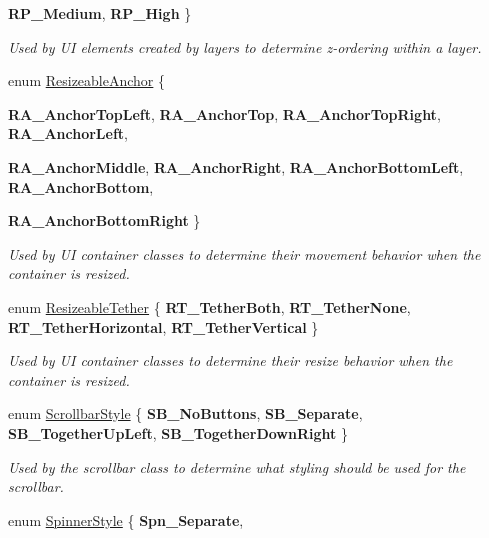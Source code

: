 \begin{DoxyCompactItemize}
{\bfseries RP\_\-Medium}, 
{\bfseries RP\_\-High}
 \}
\begin{DoxyCompactList}\small\item\em Used by UI elements created by layers to determine z-\/ordering within a layer. \item\end{DoxyCompactList}\item 
enum \hyperlink{namespaceMezzanine_1_1UI_a1c571649db3aa98f4e16285b5b754928}{ResizeableAnchor} \{ \par
{\bfseries RA\_\-AnchorTopLeft}, 
{\bfseries RA\_\-AnchorTop}, 
{\bfseries RA\_\-AnchorTopRight}, 
{\bfseries RA\_\-AnchorLeft}, 
\par
{\bfseries RA\_\-AnchorMiddle}, 
{\bfseries RA\_\-AnchorRight}, 
{\bfseries RA\_\-AnchorBottomLeft}, 
{\bfseries RA\_\-AnchorBottom}, 
\par
{\bfseries RA\_\-AnchorBottomRight}
 \}
\begin{DoxyCompactList}\small\item\em Used by UI container classes to determine their movement behavior when the container is resized. \item\end{DoxyCompactList}\item 
enum \hyperlink{namespaceMezzanine_1_1UI_a0334e290e4c9f6a5468fbe11164a17b9}{ResizeableTether} \{ {\bfseries RT\_\-TetherBoth}, 
{\bfseries RT\_\-TetherNone}, 
{\bfseries RT\_\-TetherHorizontal}, 
{\bfseries RT\_\-TetherVertical}
 \}
\begin{DoxyCompactList}\small\item\em Used by UI container classes to determine their resize behavior when the container is resized. \item\end{DoxyCompactList}\item 
enum \hyperlink{namespaceMezzanine_1_1UI_a5998a9bf372a7e92605c0c461736e763}{ScrollbarStyle} \{ {\bfseries SB\_\-NoButtons}, 
{\bfseries SB\_\-Separate}, 
{\bfseries SB\_\-TogetherUpLeft}, 
{\bfseries SB\_\-TogetherDownRight}
 \}
\begin{DoxyCompactList}\small\item\em Used by the scrollbar class to determine what styling should be used for the scrollbar. \item\end{DoxyCompactList}\item 
enum \hyperlink{namespaceMezzanine_1_1UI_a62462d4df783dcdda77e1590a96bc6d6}{SpinnerStyle} \{ {\bfseries Spn\_\-Separate}, 

\end{DoxyCompactItemize}
